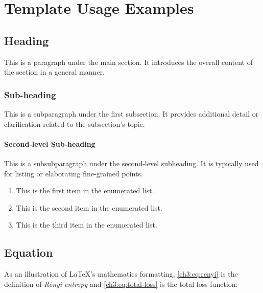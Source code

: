 \chapter{Template Usage Examples}
\label{chapter3}

\section{Heading}
\begin{paragraph}
This is a paragraph under the main section. It introduces the overall content of the section in a general manner.
\end{paragraph}

\subsection{Sub-heading}
\begin{subparagraph}
This is a subparagraph under the first subsection. It provides additional detail or clarification related to the subsection's topic.
\end{subparagraph}

\subsubsection{Second-level Sub-heading}
\begin{subsubparagraph}
This is a subsubparagraph under the second-level subheading. It is typically used for listing or elaborating fine-grained points.
\end{subsubparagraph}

\begin{enumerate}[itemindent=\subsubparitemindent]
    \item This is the first item in the enumerated list.
    \item This is the second item in the enumerated list.
    \item This is the third item in the enumerated list.
\end{enumerate}

\section{Equation}
\begin{paragraph}
As an illustration of {\LaTeX}'s mathematics formatting, \autoref{ch3:eq:renyi} is the definition of {\em R\'enyi entropy} and \autoref{ch3:eq:total-loss} is the total loss function:
\end{paragraph}

